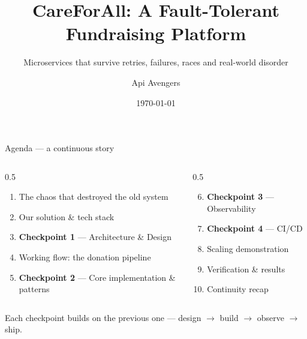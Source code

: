 \documentclass[aspectratio=169]{beamer}
\title[CareForAll]{CareForAll: A Fault-Tolerant Fundraising Platform}
\subtitle{Microservices that survive retries, failures, races and real-world disorder}
\author{Api Avengers}
\institute{Microservice Hackathon --- CUET ETE}
\date{\today}
\begin{document}
\begin{frame}[plain]
  \titlepage
\end{frame}

\begin{frame}{Agenda --- a continuous story}
  \begin{columns}[T]
    \begin{column}{0.5\textwidth}
      \begin{enumerate}
        \item The chaos that destroyed the old system
        \item Our solution \& tech stack
        \item \textbf{Checkpoint 1} --- Architecture \& Design
        \item Working flow: the donation pipeline
        \item \textbf{Checkpoint 2} --- Core implementation \& patterns
      \end{enumerate}
    \end{column}
    \begin{column}{0.5\textwidth}
      \begin{enumerate}
        \setcounter{enumi}{5}
        \item \textbf{Checkpoint 3} --- Observability
        \item \textbf{Checkpoint 4} --- CI/CD
        \item Scaling demonstration
        \item Verification \& results
        \item Continuity recap
      \end{enumerate}
    \end{column}
  \end{columns}
  \vfill
  \begin{center}\small Each checkpoint builds on the previous one --- design $\rightarrow$ build $\rightarrow$ observe $\rightarrow$ ship.\end{center}
\end{frame}
\end{document}
